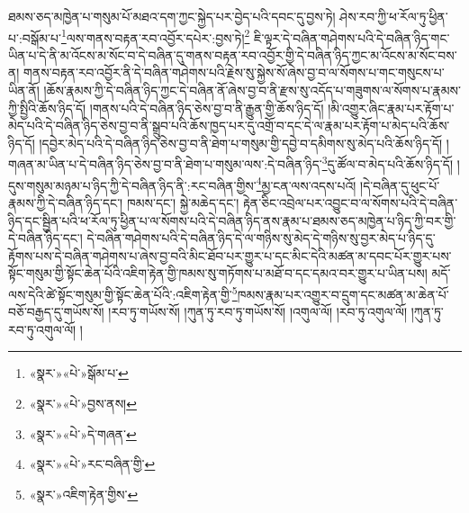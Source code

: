 ཐམས་ཅད་མཁྱེན་པ་གསུམ་པོ་མཐའ་དག་ཀྱང་སྐྱེད་པར་བྱེད་པའི་དབང་དུ་བྱས་ཏེ། ཤེས་རབ་ཀྱི་ཕ་རོལ་ཏུ་ཕྱིན་པ་:བསྒོམ་པ་\footnote{«སྣར་»«པེ་»སྒོམ་པ་}ལས་གནས་བརྟན་རབ་འབྱོར་དཔེར་:བྱས་ཏེ།\footnote{«སྣར་»«པེ་»བྱས་ནས།} ཇི་ལྟར་དེ་བཞིན་གཤེགས་པའི་དེ་བཞིན་ཉིད་གང་ཡིན་པ་དེ་ནི་མ་འོངས་མ་སོང་བ་དེ་བཞིན་དུ་གནས་བརྟན་རབ་འབྱོར་གྱི་དེ་བཞིན་ཉིད་ཀྱང་མ་འོངས་མ་སོང་བས་ན། གནས་བརྟན་རབ་འབྱོར་ནི་དེ་བཞིན་གཤེགས་པའི་རྗེས་སུ་སྐྱེས་སོ་ཞེས་བྱ་བ་ལ་སོགས་པ་གང་གསུངས་པ་ཡིན་ནོ། །ཆོས་རྣམས་ཀྱི་དེ་བཞིན་ཉིད་ཀྱང་དེ་བཞིན་ནོ་ཞེས་བྱ་བ་ནི་རྫས་སུ་འདོད་པ་གཟུགས་ལ་སོགས་པ་རྣམས་ཀྱི་སྤྱིའི་ཆོས་ཉིད་དོ། །གནས་པའི་དེ་བཞིན་ཉིད་ཅེས་བྱ་བ་ནི་རྒྱུན་གྱི་ཆོས་ཉིད་དོ། །མི་འགྱུར་ཞིང་རྣམ་པར་རྟོག་པ་མེད་པའི་དེ་བཞིན་ཉིད་ཅེས་བྱ་བ་ནི་སྒྲུབ་པའི་ཆོས་ཁྱད་པར་དུ་འགྲོ་བ་དང་དེ་ལ་རྣམ་པར་རྟོག་པ་མེད་པའི་ཆོས་ཉིད་དོ། །དབྱེར་མེད་པའི་དེ་བཞིན་ཉིད་ཅེས་བྱ་བ་ནི་ཐེག་པ་གསུམ་གྱི་དབྱེ་བ་དམིགས་སུ་མེད་པའི་ཆོས་ཉིད་དོ། །གཞན་མ་ཡིན་པ་དེ་བཞིན་ཉིད་ཅེས་བྱ་བ་ནི་ཐེག་པ་གསུམ་ལས་:དེ་བཞིན་ཉིད་\footnote{«སྣར་»«པེ་»དེ་གཞན་}དུ་ཚོལ་བ་མེད་པའི་ཆོས་ཉིད་དོ། །དུས་གསུམ་མཉམ་པ་ཉིད་ཀྱི་དེ་བཞིན་ཉིད་ནི་:རང་བཞིན་གྱིས་\footnote{«སྣར་»«པེ་»རང་བཞིན་གྱི་}མྱ་ངན་ལས་འདས་པའོ། །དེ་བཞིན་དུ་ཕུང་པོ་རྣམས་ཀྱི་དེ་བཞིན་ཉིད་དང་། ཁམས་དང་། སྐྱེ་མཆེད་དང་། རྟེན་ཅིང་འབྲེལ་པར་འབྱུང་བ་ལ་སོགས་པའི་དེ་བཞིན་ཉིད་དང་སྦྱིན་པའི་ཕ་རོལ་ཏུ་ཕྱིན་པ་ལ་སོགས་པའི་དེ་བཞིན་ཉིད་ནས་རྣམ་པ་ཐམས་ཅད་མཁྱེན་པ་ཉིད་ཀྱི་བར་གྱི་དེ་བཞིན་ཉིད་དང་། དེ་བཞིན་གཤེགས་པའི་དེ་བཞིན་ཉིད་དེ་ལ་གཉིས་སུ་མེད་དེ་གཉིས་སུ་བྱར་མེད་པ་ཉིད་དུ་རྟོགས་པས་དེ་བཞིན་གཤེགས་པ་ཞེས་བྱ་བའི་མིང་ཐོབ་པར་གྱུར་པ་དང་མིང་དེའི་མཚན་མ་དབང་པོར་གྱུར་པས་སྟོང་གསུམ་གྱི་སྟོང་ཆེན་པོའི་འཇིག་རྟེན་གྱི་ཁམས་སུ་གཏོགས་པ་མཐོ་བ་དང་དམའ་བར་གྱུར་པ་ཡིན་པས། མདོ་ལས་དེའི་ཚེ་སྟོང་གསུམ་གྱི་སྟོང་ཆེན་པོའི་:འཇིག་རྟེན་གྱི་\footnote{«སྣར་»འཇིག་རྟེན་གྱིས་}ཁམས་རྣམ་པར་འགྱུར་བ་དྲུག་དང་མཚན་མ་ཆེན་པོ་བཅོ་བརྒྱད་དུ་གཡོས་སོ། །རབ་ཏུ་གཡོས་སོ། །ཀུན་ཏུ་རབ་ཏུ་གཡོས་སོ། །འགུལ་ལོ། །རབ་ཏུ་འགུལ་ལོ། །ཀུན་ཏུ་རབ་ཏུ་འགུལ་ལོ། །
